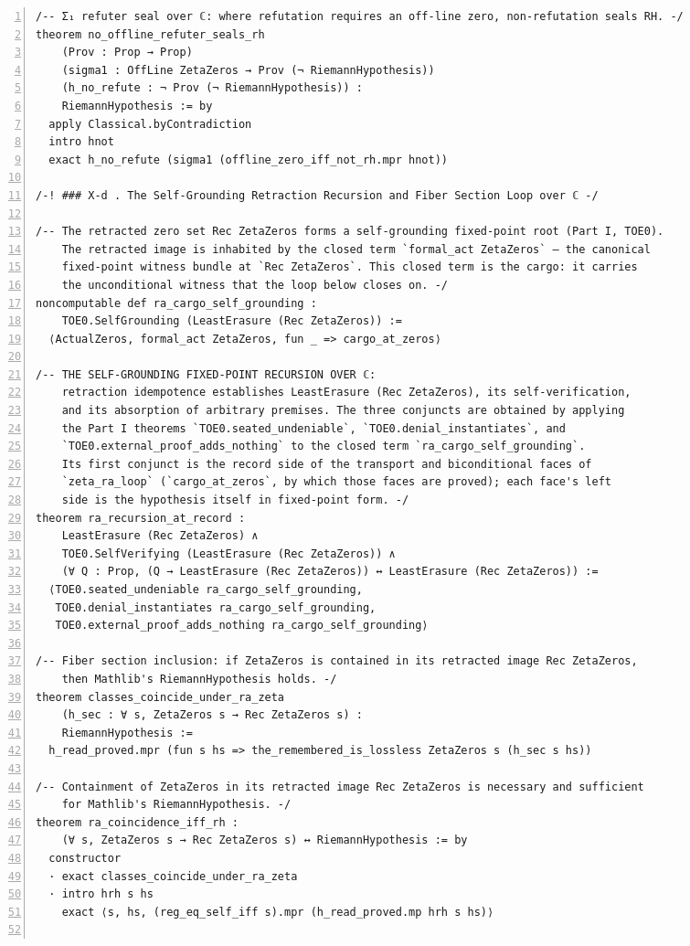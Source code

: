 \documentclass[10pt]{article}
\newcommand{\leansize}{\fontsize{5.5pt}{6.75pt}\selectfont}
\begin{document}
\begin{multicols}{2}
\begin{Verbatim}[numbers=left,firstnumber=1,numbersep=3pt,xleftmargin=2.6em,breaklines=true,breakanywhere=true,breakautoindent=false,breakindent=1.4em,breaksymbolleft={},breakanywheresymbolpre={},fontsize=\leansize]
/-- Σ₁ refuter seal over ℂ: where refutation requires an off-line zero, non-refutation seals RH. -/
theorem no_offline_refuter_seals_rh
    (Prov : Prop → Prop)
    (sigma1 : OffLine ZetaZeros → Prov (¬ RiemannHypothesis))
    (h_no_refute : ¬ Prov (¬ RiemannHypothesis)) :
    RiemannHypothesis := by
  apply Classical.byContradiction
  intro hnot
  exact h_no_refute (sigma1 (offline_zero_iff_not_rh.mpr hnot))

/-! ### X-d . The Self-Grounding Retraction Recursion and Fiber Section Loop over ℂ -/

/-- The retracted zero set Rec ZetaZeros forms a self-grounding fixed-point root (Part I, TOE0).
    The retracted image is inhabited by the closed term `formal_act ZetaZeros` — the canonical
    fixed-point witness bundle at `Rec ZetaZeros`. This closed term is the cargo: it carries
    the unconditional witness that the loop below closes on. -/
noncomputable def ra_cargo_self_grounding :
    TOE0.SelfGrounding (LeastErasure (Rec ZetaZeros)) :=
  ⟨ActualZeros, formal_act ZetaZeros, fun _ => cargo_at_zeros⟩

/-- THE SELF-GROUNDING FIXED-POINT RECURSION OVER ℂ:
    retraction idempotence establishes LeastErasure (Rec ZetaZeros), its self-verification,
    and its absorption of arbitrary premises. The three conjuncts are obtained by applying
    the Part I theorems `TOE0.seated_undeniable`, `TOE0.denial_instantiates`, and
    `TOE0.external_proof_adds_nothing` to the closed term `ra_cargo_self_grounding`.
    Its first conjunct is the record side of the transport and biconditional faces of
    `zeta_ra_loop` (`cargo_at_zeros`, by which those faces are proved); each face's left
    side is the hypothesis itself in fixed-point form. -/
theorem ra_recursion_at_record :
    LeastErasure (Rec ZetaZeros) ∧
    TOE0.SelfVerifying (LeastErasure (Rec ZetaZeros)) ∧
    (∀ Q : Prop, (Q → LeastErasure (Rec ZetaZeros)) ↔ LeastErasure (Rec ZetaZeros)) :=
  ⟨TOE0.seated_undeniable ra_cargo_self_grounding,
   TOE0.denial_instantiates ra_cargo_self_grounding,
   TOE0.external_proof_adds_nothing ra_cargo_self_grounding⟩

/-- Fiber section inclusion: if ZetaZeros is contained in its retracted image Rec ZetaZeros,
    then Mathlib's RiemannHypothesis holds. -/
theorem classes_coincide_under_ra_zeta
    (h_sec : ∀ s, ZetaZeros s → Rec ZetaZeros s) :
    RiemannHypothesis :=
  h_read_proved.mpr (fun s hs => the_remembered_is_lossless ZetaZeros s (h_sec s hs))

/-- Containment of ZetaZeros in its retracted image Rec ZetaZeros is necessary and sufficient
    for Mathlib's RiemannHypothesis. -/
theorem ra_coincidence_iff_rh :
    (∀ s, ZetaZeros s → Rec ZetaZeros s) ↔ RiemannHypothesis := by
  constructor
  · exact classes_coincide_under_ra_zeta
  · intro hrh s hs
    exact ⟨s, hs, (reg_eq_self_iff s).mpr (h_read_proved.mp hrh s hs)⟩


\end{Verbatim}
\end{multicols}
\end{document}
